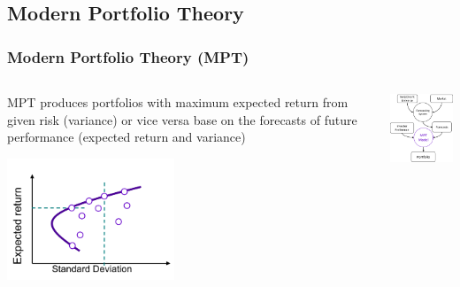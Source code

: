 \subsection{Modern Portfolio Theory}
\begin{frame}
\frametitle{Modern Portfolio Theory (MPT)}
\begin{columns}
\begin{column}{0.55\textwidth}
MPT produces portfolios with maximum expected return from given risk (variance) or vice versa base on the forecasts of future performance (expected return and variance)
\begin{center}
\includegraphics[width=5cm]{images/efficient_frontier.png}
\end{center}
\end{column}
\begin{column}{0.45\textwidth}
\begin{center}
\includegraphics[width=4.8cm]{images/mpt.png}
\end{center}
\end{column}
\end{columns}
\end{frame}


